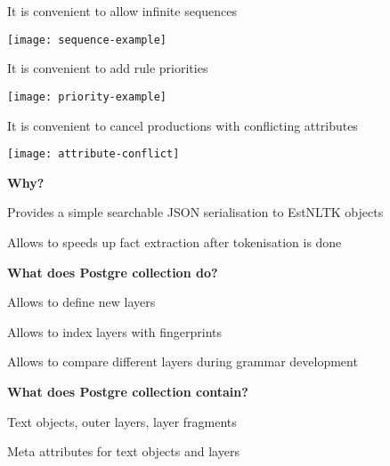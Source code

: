 \documentclass[landscape,footrule]{foils}
\begin{document}

\begin{triangles}
\item It is convenient to allow infinite sequences 

\centerline{\texttt{[image: sequence-example]}}
\item It is convenient to add rule priorities

\centerline{\texttt{[image: priority-example]}}

\item It is convenient to cancel productions with conflicting attributes

\centerline{\texttt{[image: attribute-conflict]}}


\end{triangles}



\textbf{Why?}
\begin{triangles}
\item Provides a simple searchable JSON serialisation to EstNLTK objects
\item Allows to speeds up fact extraction after tokenisation is done\vspace*{1.0cm} 
\end{triangles}

\textbf{What does Postgre collection do?}
\begin{triangles}
\item Allows to define new layers 
\item Allows to index layers with fingerprints
\item Allows to compare different layers during grammar development\vspace*{1.0cm} 
\end{triangles}


\textbf{What does Postgre collection contain?}
\begin{triangles}
\item Text objects, outer layers, layer fragments 
\item Meta attributes for text objects and layers
\end{triangles}


\end{document}
